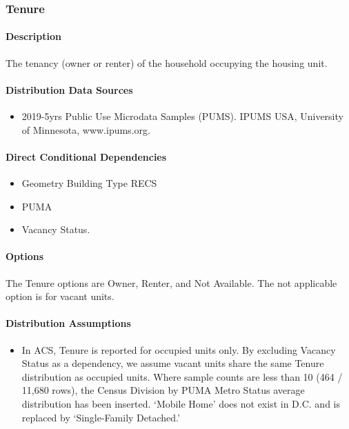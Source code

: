 \subsubsection{Tenure}\label{tenure}
\paragraph{Description}
The tenancy (owner or renter) of the household occupying the housing
unit.

\paragraph{Distribution Data Sources}
\begin{itemize}
\item
  2019-5yrs Public Use Microdata Samples (PUMS). IPUMS USA, University
  of Minnesota, www.ipums.org.
\end{itemize}

\paragraph{Direct Conditional Dependencies}
\begin{itemize}
    \item Geometry Building Type RECS
    \item PUMA
    \item Vacancy Status.
\end{itemize}

\paragraph{Options}
The Tenure options are Owner, Renter, and Not Available. The not applicable option is for vacant units.

\paragraph{Distribution Assumptions}
\begin{itemize}
\item
  In ACS, Tenure is reported for occupied units only. By excluding
  Vacancy Status as a dependency, we assume vacant units share the same
  Tenure distribution as occupied units. Where sample counts are less
  than 10 (464 / 11,680 rows), the Census Division by PUMA Metro Status
  average distribution has been inserted. `Mobile
  Home' does not exist in D.C. and is replaced by
  `Single-Family Detached.'
\end{itemize}

